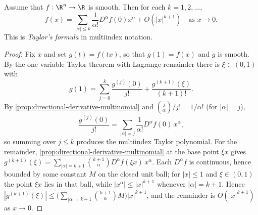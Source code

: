 \begin{proposition}
\label{prop:taylor-multiindex}
\leanok
Assume that $f : \R^n \to \R$ is smooth. Then for each $k = 1, 2, \ldots$,
$$f(x) = \sum_{|\alpha| \leq k} \frac{1}{\alpha!} D^\alpha f(0) x^\alpha + O(|x|^{k+1}) \quad \text{as } x \to 0.$$
This is \textit{Taylor's formula} in multiindex notation.
\end{proposition}
\begin{proof}
\leanok
Fix $x$ and set $g(t) = f(tx)$, so that $g(1) = f(x)$ and $g$ is smooth. By the
one-variable Taylor theorem with Lagrange remainder there is $\xi \in (0,1)$ with
$$g(1) = \sum_{j=0}^{k}\frac{g^{(j)}(0)}{j!} + \frac{g^{(k+1)}(\xi)}{(k+1)!}.$$
By \cref{prop:directional-derivative-multinomial} and
$\binom{j}{\alpha}/j! = 1/\alpha!$ (for $|\alpha| = j$),
$$\frac{g^{(j)}(0)}{j!} = \sum_{|\alpha|=j}\frac{1}{\alpha!}D^\alpha f(0)\, x^\alpha,$$
so summing over $j \leq k$ produces the multiindex Taylor polynomial. For the
remainder, \cref{prop:directional-derivative-multinomial} at the base point
$\xi x$ gives
$g^{(k+1)}(\xi) = \sum_{|\alpha|=k+1}\binom{k+1}{\alpha} D^\alpha f(\xi x)\, x^\alpha$.
Each $D^\alpha f$ is continuous, hence bounded by some constant $M$ on the closed
unit ball; for $|x| \leq 1$ and $\xi \in (0,1)$ the point $\xi x$ lies in that
ball, while $|x^\alpha| \leq |x|^{k+1}$ whenever $|\alpha| = k+1$. Hence
$|g^{(k+1)}(\xi)| \leq \bigl(\sum_{|\alpha|=k+1}\binom{k+1}{\alpha} M\bigr)|x|^{k+1}$,
and the remainder is $O(|x|^{k+1})$ as $x \to 0$.
\end{proof}
